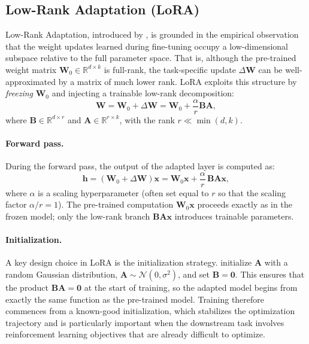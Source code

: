 \subsection{Low-Rank Adaptation (LoRA)}
\label{sec:lora}

Low-Rank Adaptation, introduced by \citet{hu2021lora}, is grounded in the
empirical observation that the weight updates learned during fine-tuning
occupy a low-dimensional subspace relative to the full parameter space.
That is, although the pre-trained weight matrix $\mathbf{W}_0 \in
\mathbb{R}^{d \times k}$ is full-rank, the task-specific update
$\Delta\mathbf{W}$ can be well-approximated by a matrix of much lower
rank.  LoRA exploits this structure by \emph{freezing} $\mathbf{W}_0$
and injecting a trainable low-rank decomposition:
\begin{equation}
  \label{eq:lora-weight}
  \mathbf{W} = \mathbf{W}_0 + \Delta\mathbf{W}
             = \mathbf{W}_0 + \frac{\alpha}{r}\mathbf{B}\mathbf{A},
\end{equation}
where $\mathbf{B} \in \mathbb{R}^{d \times r}$ and
$\mathbf{A} \in \mathbb{R}^{r \times k}$, with the rank
$r \ll \min(d, k)$.

\paragraph{Forward pass.}
During the forward pass, the output of the adapted layer is computed as:
\begin{equation}
  \label{eq:lora-forward}
  \mathbf{h} = (\mathbf{W}_0 + \Delta\mathbf{W})\mathbf{x}
             = \mathbf{W}_0 \mathbf{x}
               + \frac{\alpha}{r}\,\mathbf{B}\mathbf{A}\mathbf{x},
\end{equation}
where $\alpha$ is a scaling hyperparameter (often set equal to $r$ so that
the scaling factor $\alpha / r = 1$).  The pre-trained computation
$\mathbf{W}_0\mathbf{x}$ proceeds exactly as in the frozen model; only
the low-rank branch $\mathbf{B}\mathbf{A}\mathbf{x}$ introduces trainable
parameters.

\paragraph{Initialization.}
A key design choice in LoRA is the initialization strategy.
\citet{hu2021lora} initialize $\mathbf{A}$ with a random Gaussian
distribution, $\mathbf{A} \sim \mathcal{N}(0, \sigma^2)$, and set
$\mathbf{B} = \mathbf{0}$.  This ensures that the product
$\mathbf{B}\mathbf{A} = \mathbf{0}$ at the start of training, so the
adapted model begins from exactly the same function as the pre-trained
model.  Training therefore commences from a known-good initialization,
which stabilizes the optimization trajectory and is particularly
important when the downstream task involves reinforcement learning
objectives that are already difficult to optimize.


